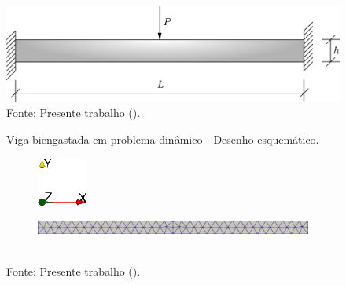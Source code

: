 \begin{figure}[h!]
    \centering
    \caption{Viga biengastada em problema dinâmico - Desenho esquemático.}
    \includegraphics[width=0.6\linewidth]{Figuras/vigas/viga2.pdf}
    \\Fonte: Presente trabalho (\the\year).
    \label{fig:viga2}
\end{figure}

\begin{figure}[h!]
    \centering
    \caption{Malha utilizada na simulação da viga biengastada.}
    \begin{subfigure}{0.05\textwidth}
        \includegraphics[width=\linewidth]{Figuras/vigas/eixos1.png}
    \end{subfigure}
    \begin{subfigure}{0.94\textwidth}
        \includegraphics[width=\linewidth]{Figuras/vigas/mesh2.png}
    \end{subfigure}
    \\Fonte: Presente trabalho (\the\year).
    \label{fig:viga2-mesh}
\end{figure}

